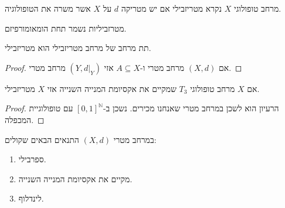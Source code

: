 \documentclass{tstextbook}
\begin{document}
\begin{definition}
מרחב טופולוגי \(X\) נקרא מטריזבילי אם יש מטריקה \(d\) על \(X\) אשר משרה את הטופולוגיה.

\end{definition}
\begin{proposition}
מטרזביליות נשמר תחת הומאומורפיזם.

\end{proposition}
\begin{proposition}
תת מרחב של מרחב מטריזבילי הוא מטריזבילי.

\end{proposition}
\begin{proof}
אם \((X,d)\) מרחב מטרי ו-\(A\subseteq X\) אזי \((Y,d|_{Y})\) מרחב מטרי.

\end{proof}
\begin{theorem}
אם \(X\) מרחב טופולוגי \(T_{3}\) שמקיים את אקסיומת המנייה השנייה אזי \(X\) מטריזבילי.

\end{theorem}
\begin{proof}
הרעיון הוא לשכן במרחב מטרי שאנחנו מכירים. נשכן ב-\([0,1]^{\mathbb{N}}\) עם טופולוגיית המכפלה.

\end{proof}
\begin{proposition}
במרחב מטרי \((X,d)\) התנאים הבאים שקולים:

  \begin{enumerate}
    \item ספרבילי. 


    \item מקיים את אקסיומת המנייה השנייה. 


    \item לינדלוף. 


  \end{enumerate}
\end{proposition}
\end{document}
